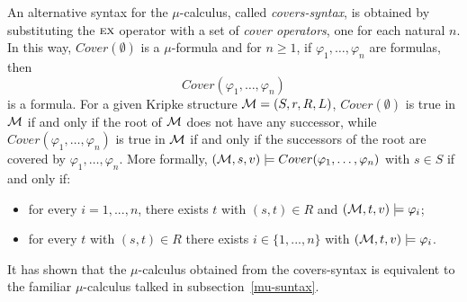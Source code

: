 \documentclass[runningheads]{llncs}
\begin{document}
An alternative syntax for the $\mu$-calculus, called \emph{covers-syntax}, is obtained by substituting the $\textsc{e}\textsc{x}$ operator with a set of \emph{cover operators}, one for each natural $n$.
In this way, $Cover(\emptyset)$ is a $\mu$-formula and for $n \geq 1$, if $\varphi_1, \dots, \varphi_n$ are formulas, then
\[
Cover(\varphi_1, \dots, \varphi_n)
\]
is a formula. For a given Kripke structure ${\cal M} = (S,r,R,L)$, $Cover(\emptyset)$ is true in ${\cal M}$ if and only if the root of ${\cal M}$ does not have any successor, while $Cover(\varphi_1, \dots, \varphi_n)$ is true in ${\cal M}$ if and only if the successors
of the root are covered by $\varphi_1, \dots, \varphi_n$. More formally, $({\cal M}, s,v ) \models Cover(\varphi_1, \dots, \varphi_n)$ with $s \in S$
if and only if:
\begin{itemize}
	\item for every $i = 1, . . . , n$, there exists $t$ with $(s, t) \in R$ and $({\cal M}, t,v) \models \varphi_i$;
	\item for every $t$ with $(s, t) \in R$ there exists $i\in \{1, . . . , n\}$ with $({\cal M}, t,v) \models \varphi_i$.
\end{itemize}

It has shown that the $\mu$-calculus obtained from the covers-syntax is equivalent to the familiar $\mu$-calculus talked in subsection~\ref{mu-suntax}\cite{d2006modal}.
\end{document}
